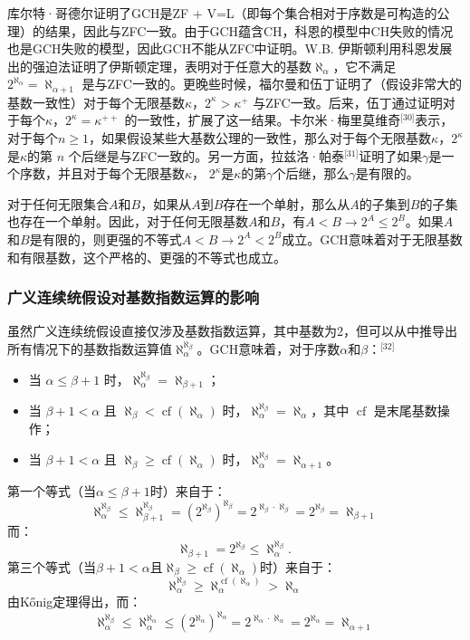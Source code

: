 库尔特·哥德尔证明了GCH是ZF + V=L（即每个集合相对于序数是可构造的公理）的结果，因此与ZFC一致。由于GCH蕴含CH，科恩的模型中CH失败的情况也是GCH失败的模型，因此GCH不能从ZFC中证明。W.B. 伊斯顿利用科恩发展出的强迫法证明了伊斯顿定理，表明对于任意大的基数\( \aleph_\alpha \)，它不满足\( 2^{\aleph_\alpha} = \aleph_{\alpha + 1} \) 是与ZFC一致的。更晚些时候，福尔曼和伍丁证明了（假设非常大的基数一致性）对于每个无限基数\( \kappa \)，\( 2^\kappa > \kappa^+ \) 与ZFC一致。后来，伍丁通过证明对于每个\( \kappa \)，\( 2^\kappa = \kappa^{++} \) 的一致性，扩展了这一结果。卡尔米·梅里莫维奇\(^\text{[30]}\)表示，对于每个\( n \geq 1 \)，如果假设某些大基数公理的一致性，那么对于每个无限基数\( \kappa \)，\( 2^\kappa \)是\( \kappa \)的第 \( n \) 个后继是与ZFC一致的。另一方面，拉兹洛·帕泰\(^\text{[31]}\)证明了如果\( \gamma \)是一个序数，并且对于每个无限基数\( \kappa \)， \( 2^\kappa \)是\( \kappa \)的第\( \gamma \)个后继，那么\( \gamma \)是有限的。

对于任何无限集合\( A \)和\( B \)，如果从\( A \)到\( B \)存在一个单射，那么从\( A \)的子集到\( B \)的子集也存在一个单射。因此，对于任何无限基数\( A \)和\( B \)，有\( A < B \to 2^A \leq 2^B \)。如果\( A \)和\( B \)是有限的，则更强的不等式\( A < B  \to 2^A < 2^B \)成立。GCH意味着对于无限基数和有限基数，这个严格的、更强的不等式也成立。
\subsubsection{广义连续统假设对基数指数运算的影响} 
虽然广义连续统假设直接仅涉及基数指数运算，其中基数为2，但可以从中推导出所有情况下的基数指数运算值\( \aleph_{\alpha}^{\aleph_{\beta}} \)。GCH意味着，对于序数\( \alpha \)和\( \beta \)：\(^\text{[32]}\)
\begin{itemize}
\item 当 \( \alpha \leq \beta + 1 \) 时，\( \aleph_{\alpha}^{\aleph_{\beta}} = \aleph_{\beta + 1} \)；
\item 当 \( \beta + 1 < \alpha \) 且 \( \aleph_{\beta} < \operatorname{cf}(\aleph_{\alpha}) \) 时，\( \aleph_{\alpha}^{\aleph_{\beta}} = \aleph_{\alpha} \)，其中 \( \operatorname{cf} \) 是末尾基数操作；
\item 当 \( \beta + 1 < \alpha \) 且 \( \aleph_{\beta} \geq \operatorname{cf}(\aleph_{\alpha}) \) 时，\( \aleph_{\alpha}^{\aleph_{\beta}} = \aleph_{\alpha + 1} \)。
\end{itemize}
第一个等式（当\( \alpha \leq \beta + 1 \)时）来自于：
\[
\aleph_{\alpha}^{\aleph_{\beta}} \leq \aleph_{\beta + 1}^{\aleph_{\beta}} = (2^{\aleph_{\beta}})^{\aleph_{\beta}} = 2^{\aleph_{\beta} \cdot \aleph_{\beta}} = 2^{\aleph_{\beta}} = \aleph_{\beta + 1}~
\]
而：
\[
\aleph_{\beta + 1} = 2^{\aleph_{\beta}} \leq \aleph_{\alpha}^{\aleph_{\beta}}.~
\]
第三个等式（当\( \beta + 1 < \alpha \)且\( \aleph_{\beta} \geq \operatorname{cf}(\aleph_{\alpha}) \)时）来自于：
\[
\aleph_{\alpha}^{\aleph_{\beta}} \geq \aleph_{\alpha}^{\operatorname{cf}(\aleph_{\alpha})} > \aleph_{\alpha}~
\]
由Kőnig定理得出，而：
\[
\aleph_{\alpha}^{\aleph_{\beta}} \leq \aleph_{\alpha}^{\aleph_{\alpha}} \leq (2^{\aleph_{\alpha}})^{\aleph_{\alpha}} = 2^{\aleph_{\alpha} \cdot \aleph_{\alpha}} = 2^{\aleph_{\alpha}} = \aleph_{\alpha + 1}~
\]
